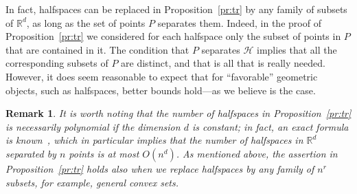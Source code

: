 \documentclass[11pt]{article}
\newtheorem{remark}[theo]{Remark}
\newcommand{\R}{{\mathbb R}}
\newcommand{\HH}{{\cal H}}
\begin{document}
In fact, halfspaces can be replaced in Proposition~\ref{pr:tr} by any family of subsets of $\R^d$, as long as the set of points $P$ separates them.
Indeed, in the proof of Proposition~\ref{pr:tr} we considered for each halfspace only the subset of points in $P$ that are contained in it. The condition that $P$ separates $\mathcal H$ implies that all the corresponding subsets of $P$ are distinct, and that is all that is really needed.
%
However, it does seem reasonable to expect that for ``favorable'' geometric objects, such as halfspaces, better bounds hold---as we believe is the case.

\begin{remark}
	It is worth noting that the number of halfspaces in 
Proposition~\ref{pr:tr} is necessarily polynomial 
if the dimension $d$ is constant; in fact, an exact formula is known~\cite{Ha}, 
which in particular implies that the number of halfspaces in $\R^d$ 
separated by $n$ points is at most $O(n^d)$. As mentioned above, 
the assertion in Proposition~\ref{pr:tr} holds also when we replace 
halfspaces by any family of $n^r$ subsets, for example, general 
convex sets. 
\end{remark}


%	
\end{document}
